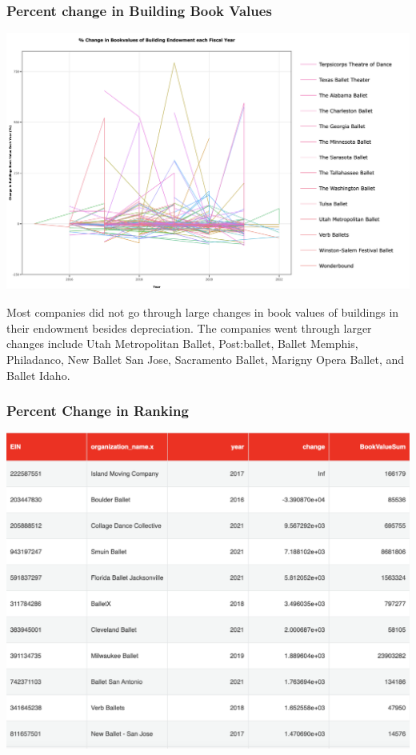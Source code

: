\documentclass[Dance Data
Project,article,submit,moreauthors,pdftex]{mdpi}
\begin{document}
\hypertarget{percent-change-in-building-book-values}{%
\subsubsection{Percent change in Building Book
Values}\label{percent-change-in-building-book-values}}

\includegraphics[width=0.9\linewidth,]{../images/percentage_building}

Most companies did not go through large changes in book values of
buildings in their endowment besides depreciation. The companies went
through larger changes include Utah Metropolitan Ballet, Post:ballet,
Ballet Memphis, Philadanco, New Ballet San Jose, Sacramento Ballet,
Marigny Opera Ballet, and Ballet Idaho.

\hypertarget{percent-change-in-ranking}{%
\subsubsection{Percent Change in
Ranking}\label{percent-change-in-ranking}}

\includegraphics[width=0.6\linewidth,]{../images/percent_change_ranking}
\end{document}
